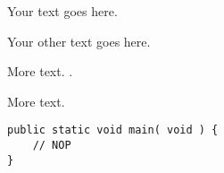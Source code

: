 \documentclass{technical_assignment_report}
\begin{document}
\fulltitle

\brief

Your text goes here.

\environment

Your other text goes here.


More text. .

\error


More text.

\begin{verbatim}
public static void main( void ) {
	// NOP
}
\end{verbatim}
\end{document}
